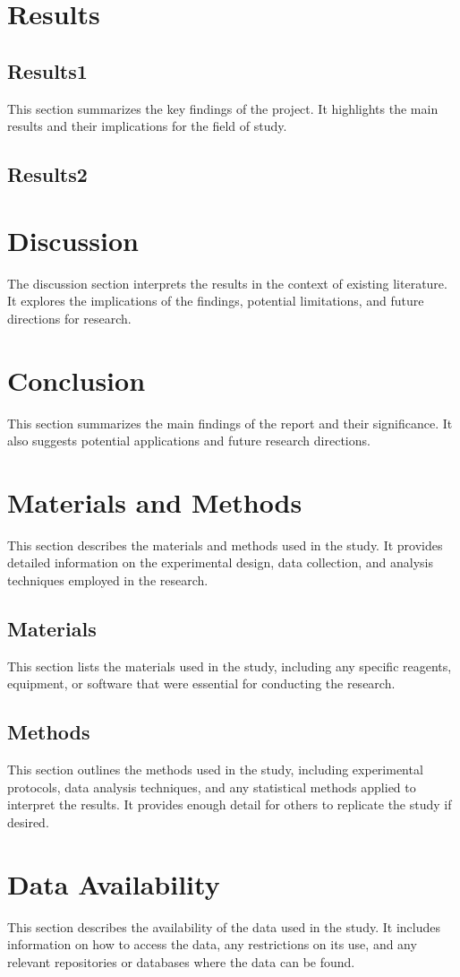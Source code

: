 \section{Results}
\subsection{Results1}
This section summarizes the key findings of the  project. It highlights the main results and their implications for the field of study.
\subsection{Results2}
\section{Discussion}
The discussion section interprets the results in the context of existing literature. It explores the implications of the findings, potential limitations, and future directions for research.
\section{Conclusion}
This section summarizes the main findings of the report and their significance. It also suggests potential applications and future research directions.
\section{Materials and Methods}
This section describes the materials and methods used in the study. It provides detailed information on the experimental design, data collection, and analysis techniques employed in the research.
\subsection{Materials}
This section lists the materials used in the study, including any specific reagents, equipment, or software that were essential for conducting the research.
\subsection{Methods}
This section outlines the methods used in the study, including experimental protocols, data analysis techniques, and any statistical methods applied to interpret the results. It provides enough detail for others to replicate the study if desired.
\section{Data Availability}
This section describes the availability of the data used in the study. It includes information on how to access the data, any restrictions on its use, and any relevant repositories or databases where the data can be found.
